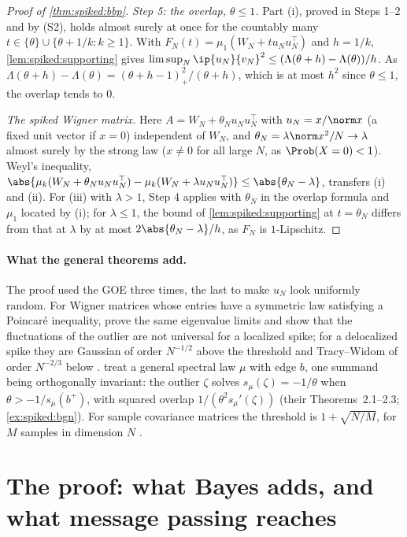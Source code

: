 \begin{refsection}
\begin{proof}[Proof of \cref{thm:spiked:bbp}]
\emph{Step 5: the overlap, $\theta\le1$.} Part (i), proved in Steps 1--2 and by (S2), holds almost surely at once for the countably many $t\in\{\theta\}\cup\{\theta+1/k:k\ge1\}$. With $F_N(t)=\mu_1(W_N+tu_Nu_N^\top)$ and $h=1/k$, \cref{lem:spiked:supporting} gives $\limsup_N\ip{u_N}{v_N}^2\le(\Lambda(\theta+h)-\Lambda(\theta))/h$. As $\Lambda(\theta+h)-\Lambda(\theta)=(\theta+h-1)_+^2/(\theta+h)$, which is at most $h^2$ since $\theta\le1$, the overlap tends to $0$.

\emph{The spiked Wigner matrix.} Here $A=W_N+\theta_Nu_Nu_N^\top$ with $u_N=x/\norm x$ (a fixed unit vector if $x=0$) independent of $W_N$, and $\theta_N=\lambda\norm x^2/N\to\lambda$ almost surely by the strong law ($x\ne0$ for all large $N$, as $\Prob(X=0)<1$). Weyl's inequality, $\abs{\mu_k(W_N+\theta_Nu_Nu_N^\top)-\mu_k(W_N+\lambda u_Nu_N^\top)}\le\abs{\theta_N-\lambda}$, transfers (i) and (ii). For (iii) with $\lambda>1$, Step 4 applies with $\theta_N$ in the overlap formula and $\mu_1$ located by (i); for $\lambda\le1$, the bound of \cref{lem:spiked:supporting} at $t=\theta_N$ differs from that at $\lambda$ by at most $2\abs{\theta_N-\lambda}/h$, as $F_N$ is $1$-Lipschitz.
\end{proof}

\paragraph{What the general theorems add.} The proof used the GOE three times, the last to make $u_N$ look uniformly random. For Wigner matrices whose entries have a symmetric law satisfying a Poincaré inequality, \textcite{CapitaineDonatiMartinFeral2009} prove the same eigenvalue limits and show that the fluctuations of the outlier are not universal for a localized spike; for a delocalized spike they are Gaussian of order $N^{-1/2}$ above the threshold and Tracy--Widom of order $N^{-2/3}$ below \parencite{Peche2006,FeralPeche2007}. \Textcite{BenaychGeorgesNadakuditi2011} treat a general spectral law $\mu$ with edge $b$, one summand being orthogonally invariant: the outlier $\zeta$ solves $s_\mu(\zeta)=-1/\theta$ when $\theta>-1/s_\mu(b^+)$, with squared overlap $1/(\theta^2s_\mu'(\zeta))$ (their Theorems~2.1--2.3; \cref{ex:spiked:bgn}). For sample covariance matrices the threshold is $1+\sqrt{N/M}$, for $M$ samples in dimension $N$ \parencite[Theorem~1.1]{BaikBenArousPeche2005}.

\section{The proof: what Bayes adds, and what message passing reaches}\label{sec:spiked:bayes}


\end{refsection}
